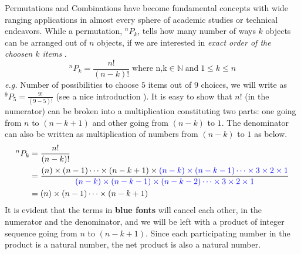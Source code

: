 \documentclass[10pt, twoside]{article}
\newcommand*{\Permutation}[2]{{}^{#1}P_{#2}}%
\begin{document}
	Permutations and Combinations have become fundamental concepts with wide ranging applications in almost every sphere of academic studies or technical endeavors. While a permutation, $\Permutation{n}{k}$, tells how many number of ways $k$ objects can be arranged out of $n$ objects, if we are interested in \textit{exact order of the choosen $k$ items} \cite{PrincTechCombinatorics}.
		\begin{equation}
			\Permutation{n}{k} = \frac{n!}{(n-k)!}  \; \text{where n,k} \in \mathbb{N}  \; \text{and} \; 1 \leq k \leq n
		\end{equation}
		 \textit{e.g.} Number of possibilities to choose $5$ items out of $9$ choices, we will write as $\Permutation{9}{5} =\frac{9!}{(9-5)!}$ (see a nice introduction \cite{ProbabilityKIndle}).
		 It is easy to show that $n!$ (in the numerator) can be broken into a multiplication constituting two parts: one going from $n$ to $(n-k+1)$ and other going from $(n-k)$ to $1$. The denominator can also be written as multiplication of numbers from {\color{blue}$(n-k)$} to {\color{blue}$1$} as below.
		 \begin{align}
		 	\Permutation{n}{k} &= \frac{n!}{(n-k)!} \nonumber \\
		 	&= \frac{(n)\times(n-1)\cdots\times(n-k+1)\times\color{blue}(n-k)\times(n-k-1)\cdots\times3\times2\times1}{\color{blue}(n-k)\times(n-k-1)\times(n-k-2)\cdots\times3\times2\times1} \nonumber \\
		 	&= (n)\times(n-1)\cdots\times(n-k+1) \label{CondensedEquationPermutation}
		 \end{align}
	 	It is evident that the terms in \textbf{\color{blue}blue fonts} will cancel each other, in the numerator and the denominator, and we will be left with a product of integer sequence going from $n$ to $(n-k+1)$. Since each participating number in the product is a natural number, the net product is also a natural number.
	 	
\end{document}
